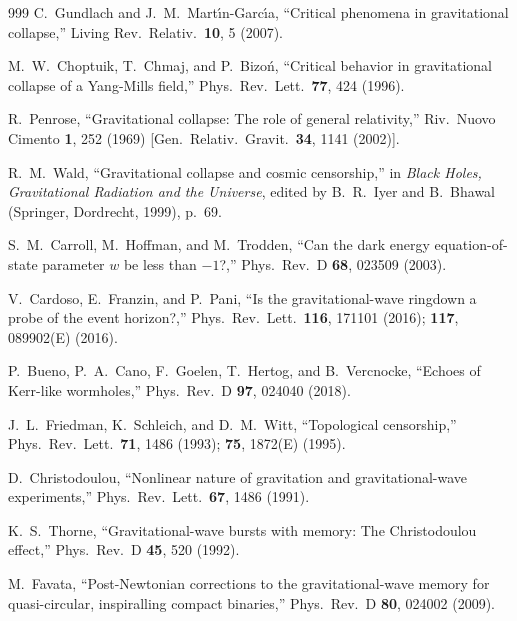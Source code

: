 \documentclass[twocolumn,floatfix,aps,prd,superscriptaddress,nofootinbib]{revtex4-2}
\begin{document}
\begin{thebibliography}{999}
C.~Gundlach and J.~M.~Mart\'{\i}n-Garc\'{\i}a,
\newblock ``Critical phenomena in gravitational collapse,''
\newblock Living Rev.\ Relativ.\ \textbf{10}, 5 (2007).

M.~W.~Choptuik, T.~Chmaj, and P.~Bizo\'n,
\newblock ``Critical behavior in gravitational collapse of a Yang-Mills field,''
\newblock Phys.\ Rev.\ Lett.\ \textbf{77}, 424 (1996).

R.~Penrose,
\newblock ``Gravitational collapse: The role of general relativity,''
\newblock Riv.\ Nuovo Cimento \textbf{1}, 252 (1969) [Gen.\ Relativ.\ Gravit.\ \textbf{34}, 1141 (2002)].

R.~M.~Wald,
\newblock ``Gravitational collapse and cosmic censorship,''
\newblock in \emph{Black Holes, Gravitational Radiation and the Universe}, edited by B.~R.~Iyer and B.~Bhawal
\newblock (Springer, Dordrecht, 1999), p.~69.

S.~M.~Carroll, M.~Hoffman, and M.~Trodden,
\newblock ``Can the dark energy equation-of-state parameter $w$ be less than $-1$?,''
\newblock Phys.\ Rev.\ D \textbf{68}, 023509 (2003).

V.~Cardoso, E.~Franzin, and P.~Pani,
\newblock ``Is the gravitational-wave ringdown a probe of the event horizon?,''
\newblock Phys.\ Rev.\ Lett.\ \textbf{116}, 171101 (2016); \textbf{117}, 089902(E) (2016).

P.~Bueno, P.~A.~Cano, F.~Goelen, T.~Hertog, and B.~Vercnocke,
\newblock ``Echoes of Kerr-like wormholes,''
\newblock Phys.\ Rev.\ D \textbf{97}, 024040 (2018).

J.~L.~Friedman, K.~Schleich, and D.~M.~Witt,
\newblock ``Topological censorship,''
\newblock Phys.\ Rev.\ Lett.\ \textbf{71}, 1486 (1993); \textbf{75}, 1872(E) (1995).

D.~Christodoulou,
\newblock ``Nonlinear nature of gravitation and gravitational-wave experiments,''
\newblock Phys.\ Rev.\ Lett.\ \textbf{67}, 1486 (1991).

K.~S.~Thorne,
\newblock ``Gravitational-wave bursts with memory: The Christodoulou effect,''
\newblock Phys.\ Rev.\ D \textbf{45}, 520 (1992).

M.~Favata,
\newblock ``Post-Newtonian corrections to the gravitational-wave memory for quasi-circular, inspiralling compact binaries,''
\newblock Phys.\ Rev.\ D \textbf{80}, 024002 (2009).


\end{thebibliography}
\end{document}
